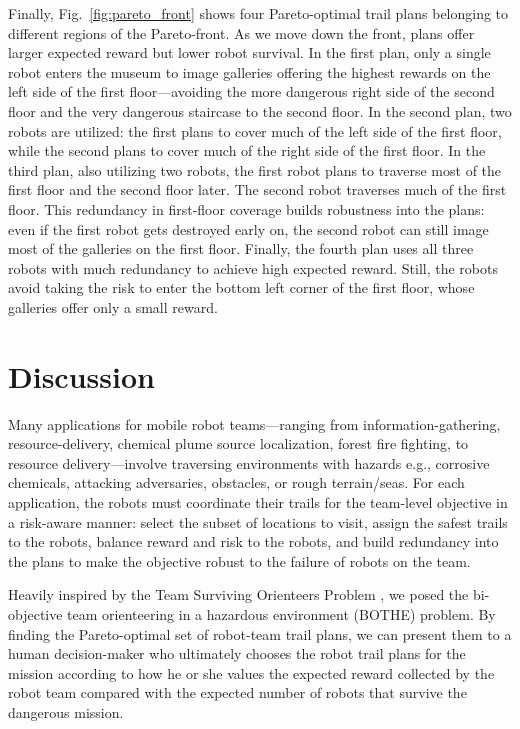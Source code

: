 \documentclass[11pt, oneside]{article}
\begin{document}
Finally, Fig.~\ref{fig:pareto_front} shows four Pareto-optimal trail plans belonging to different regions of the Pareto-front. 
As we move down the front, plans offer larger expected reward but lower robot survival.
In the first plan, only a single robot enters the museum to image galleries offering the highest rewards on the left side of the first floor---avoiding the more dangerous right side of the second floor and the very dangerous staircase to the second floor. 
In the second plan, two robots are utilized: the first plans to cover much of the left side of the first floor, while the second plans to cover much of the right side of the first floor.
In the third plan, also utilizing two robots, the first robot plans to traverse most of the first floor and the second floor later. The second robot traverses much of the first floor. This redundancy in first-floor coverage builds robustness into the plans: even if the first robot gets destroyed early on, the second robot can still image most of the galleries on the first floor.
Finally, the fourth plan uses all three robots with much redundancy to achieve high expected reward. Still, the robots avoid taking the risk to enter the bottom left corner of the first floor, whose galleries offer only a small reward.


\section{Discussion}
Many applications for mobile robot teams---ranging from information-gathering, resource-delivery, chemical plume source localization, forest fire fighting, to resource delivery---involve traversing environments with hazards e.g., corrosive chemicals, attacking adversaries, obstacles, or rough terrain/seas. 
For each application, the robots must coordinate their trails for the team-level objective in a risk-aware manner: select the subset of locations to visit, assign the safest trails to the robots, balance reward and risk to the robots, and build redundancy into the plans to make the objective robust to the failure of robots on the team. 

Heavily inspired by the Team Surviving Orienteers Problem \cite{jorgensen2018team,jorgensen2017matroid,jorgensen2024matroid}, we posed the bi-objective team orienteering in a hazardous environment (BOTHE) problem. 
By finding the Pareto-optimal set of robot-team trail plans, we can present them to a human decision-maker who ultimately chooses the robot trail plans for the mission according to how he or she values the expected reward collected by the robot team compared with the expected number of robots that survive the dangerous mission.
\end{document}
